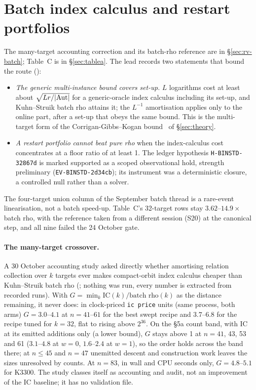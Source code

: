 \section{Batch index calculus and restart portfolios}\label{sec:kc-batch}

The many-target accounting correction and its batch-rho reference are in
\S\ref{sec:rv-batch}; Table~C is in \S\ref{sec:tablea}. The lead records
two statements that bound the route
():
\begin{itemize}
\item \emph{The generic multi-instance bound covers set-up.} $L$ logarithms
  cost at least about $\sqrt{Lr/\lvert \mathrm{Aut} \rvert}$ for a generic-oracle
  index calculus including its set-up, and Kuhn--Struik batch rho attains
  it; the $L^{-1}$ amortisation applies only to the online part, after a
  set-up that obeys the same bound. This is the multi-target form of the
  Corrigan-Gibbs--Kogan bound~\cite{cgk2018} of \S\ref{sec:theory}.
\item \emph{A restart portfolio cannot beat pure rho} when the
  index-calculus cost concentrates at a floor ratio of at least 1. The
  ledger hypothesis \texttt{H-BINSTD-32867d} is marked supported as a scoped
  observational hold, strength preliminary (\texttt{EV-BINSTD-2d34cb}); its
  instrument was a deterministic closure, a controlled null rather than a
  solver.
\end{itemize}
The four-target union column of the September batch thread is a rare-event
linearisation, not a batch speed-up. Table~C's 32-target rows stay
$3.62$--$14.9\times$ batch rho, with the reference taken from a different
session (S20) at the canonical step, and all nine failed the 24 October
gate.

\paragraph{The many-target crossover.} A 30 October accounting study asked
directly whether amortising relation collection over $k$ targets ever makes
compact-orbit index calculus cheaper than Kuhn--Struik batch rho
(; nothing was run,
every number is extracted from recorded runs). With $G=\min_k
\mathrm{IC}(k)/\text{batch rho}(k)$ as the distance remaining, it never does:
in clock-priced \texttt{ic price} units (same process, both arms) $G=3.0$--$4.1$
at $n=41$--$61$ for the best swept recipe and $3.7$--$6.8$ for the recipe tuned
for $k=32$, flat to rising above $2^{36}$. On the \S5a count band, with IC at
its emitted additions only (a lower bound), $G$ stays above 1 at $n=41$, 43,
53 and 61 ($3.1$--$4.8$ at $w=0$, $1.6$--$2.4$ at $w=1$), so the order holds
across the band there; at $n\le45$ and $n=47$ unemitted descent and
construction work leaves the sizes unresolved by counts. At $n=83$, in wall
and CPU seconds only, $G=4.8$--$5.1$ for K3300. The study classes itself as
accounting and audit, not an improvement of the IC baseline; it has no
validation file.

